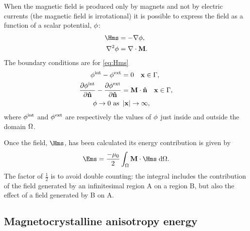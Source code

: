 


When the magnetic field is produced only by magnets and not by electric currents (\ie the magnetic field is irrotational) it is possible to express the field as a function of a scalar potential, $\phi$: %
\begin{equation}
  \begin{aligned}
    \label{eq:Hms}
    \Hms &= - \nabla \phim, \\
    \lap \phim &= \nabla \cdot \Mv.
  \end{aligned}
\end{equation}
The boundary conditions are for \cref{eq:Hms}
\begin{equation}
  \begin{aligned}
    \label{eq:cont-phi-bound}
    \phi^{\text{int}} - \phi^{\text{ext}} &= 0 \quad \mathbf{x} \in {\Gamma}, \\
    \frac{\partial \phi^{\text{int}}}{\partial \mathbf{\hat{n}}} - \frac{\partial \phi^{\text{ext}}}{\partial \mathbf{\hat{n}}} &= \mathbf{M} \cdot \mathbf{\hat{n}} \quad \mathbf{x} \in {\Gamma}, \\
    \phi \rightarrow 0 \text{ as } &\left|{\mathbf{x}} \right| \rightarrow \infty,
  \end{aligned}
\end{equation}
where $\phi^{\text{int}}$ and $\phi^{\text{ext}}$ are respectively the values of $\phi$ just inside and outside the domain $\Omega$.


Once the field, $\Hms$, has been calculated its energy contribution is given by
\begin{equation}
  \label{eq:41}
  \Ems =  \frac{-\mu_0}{2} \int_{\magd} \Mv \cdot \Hms \d \magd.
\end{equation}
The factor of $\frac{1}{2}$ is to avoid double counting: the integral includes the contribution of the field generated by an infinitesimal region A on a region B, but also the effect of a field generated by B on A.

\subsection{Magnetocrystalline anisotropy energy}
\label{sec:magn-anis}


